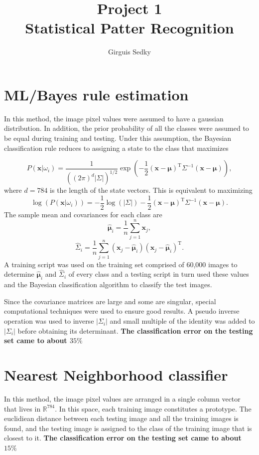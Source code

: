 \documentclass[12pt]{article}
\date{}
\title{Project 1 \large \\
        Statistical Patter Recognition}
\author{Girguis Sedky}
\begin{document}
\maketitle


\section{ML/Bayes rule estimation}
In this method, the image pixel values were assumed to have a gaussian distribution. In addition, the prior probability of all the classes were assumed to be equal during training and testing. Under this assumption, the Bayesian classification rule reduces to assigning a state to the class that maximizes 

\begin{equation}
P(\bm{x}|\omega_i) = \frac{1}{((2\pi)^d |\Sigma|)^{1/2}}\exp\left(-\frac{1}{2}(\bm{x}-\bm{\mu})^{\text{T}}\Sigma^{-1}(\bm{x}-\bm{\mu})\right),
\end{equation}  
where $d=784$ is the length of the state vectors. This is equivalent to maximizing
\begin{equation}
\log\left(P(\bm{x}|\omega_i)\right) = -\frac{1}{2}\log(|\Sigma|)- \frac{1}{2}(\bm{x}-\bm{\mu})^{\text{T}}\Sigma^{-1}(\bm{x}-\bm{\mu}).
\end{equation} 
The sample mean and covariances for each class are
\begin{equation}
\bm{\hat{\mu}}_i = \frac{1}{n}\sum_{j=1}^{n}\bm{x}_j,
\end{equation}
\begin{equation}
\hat{\Sigma}_i = \frac{1}{n}\sum_{j=1}^{n}(\bm{x}_j-\bm{\hat{\mu}}_i)(\bm{x}_j-\bm{\hat{\mu}}_i)^{\text{T}}.
\end{equation}
A training script was used on the training set comprised of 60,000 images to determine $\bm{\hat{\mu}}_i$ and $\hat{\Sigma}_i$ of every class and a testing script in turn used these values and the Bayesian classification algorithm to classify the test images.

Since the covariance matrices are large and some are singular, special computational techniques were used to ensure good results. A pseudo inverse operation was used to inverse $|\Sigma_i|$ and small multiple of the identity was added to $|\Sigma_i|$ before obtaining its determinant. \textbf{The classification error on the testing set came to about $35 \%$}


\section{Nearest Neighborhood classifier}
In this method, the image pixel values are arranged in a single column vector that lives in $\mathbb{R}^{784}$. In this space, each training image constitutes a prototype. The euclidiean distance between each testing image and all the training images is found, and the testing image is assigned to the class of the training image that is closest to it. \textbf{The classification error on the testing set came to about $15 \%$}
\end{document}
